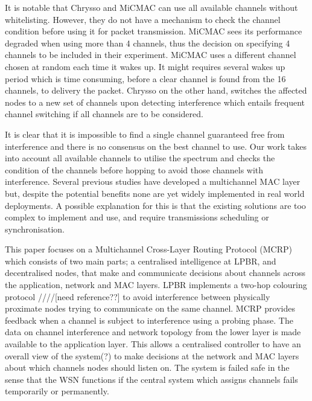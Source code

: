 It is notable that Chrysso and MiCMAC can use all available channels without whitelisting. However, they do not have a mechanism to check the channel condition before using it for packet transmission. MiCMAC sees its performance degraded when using more than 4 channels, thus the decision on specifying 4 channels to be included in their experiment. 
MiCMAC uses a different channel chosen at random each time it wakes up.
It might requires several wakes up period which is time consuming, before a clear channel is found from the 16 channels, to delivery the packet. 
Chrysso on the other hand, switches the affected nodes to a new set of channels upon detecting interference which entails frequent channel switching if all channels are to be considered.

It is clear that it is impossible to find a single channel guaranteed free from interference and there is no consensus on the best channel to use. Our work takes into account all available channels to utilise the spectrum and checks the condition of the channels before hopping to avoid those channels with interference. Several previous studies have developed a multichannel MAC layer but, despite the potential benefits none are yet widely implemented in real world deployments. 
A possible explanation for this is that the existing solutions are too complex to implement and use, and require transmissions scheduling or synchronisation. 

This paper focuses on a Multichannel Cross-Layer Routing Protocol (MCRP) which consists of two main parts; a centralised intelligence at LPBR, and decentralised nodes, that make and communicate decisions about channels across the application, network and MAC layers. LPBR implements a two-hop colouring protocol ////[need reference??] to avoid interference between physically proximate nodes trying to communicate on the same channel. MCRP provides feedback when a channel is subject to interference using a probing phase. The data on channel interference and network topology from the lower layer is made available to the application layer. This allows a centralised controller to have an overall view of the system(?) to make decisions at the network and MAC layers about which channels nodes should listen on. The system is failed safe in the sense that the WSN functions if the central system which assigns channels fails temporarily or permanently.

